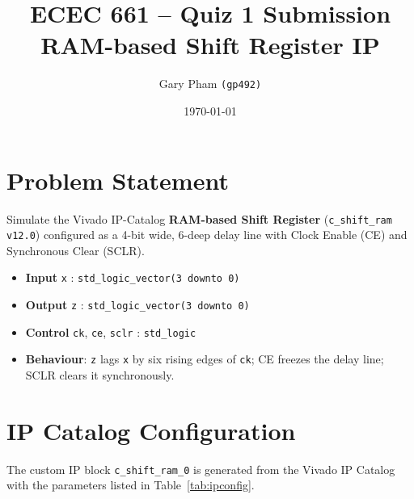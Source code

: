 \documentclass[11pt,letterpaper]{article}
\title{\textbf{ECEC 661 -- Quiz 1 Submission}\\
       \large RAM-based Shift Register IP}
\author{Gary Pham \texttt{(gp492)}}
\date{\today}
\begin{document}
\maketitle

\section{Problem Statement}

Simulate the Vivado IP-Catalog \textbf{RAM-based Shift Register}
(\texttt{c\_shift\_ram v12.0}) configured as a 4-bit wide,
6-deep delay line with Clock Enable (CE) and Synchronous Clear (SCLR).

\begin{itemize}
    \item \textbf{Input} \texttt{x} : \texttt{std\_logic\_vector(3 downto 0)}
    \item \textbf{Output} \texttt{z} : \texttt{std\_logic\_vector(3 downto 0)}
    \item \textbf{Control} \texttt{ck}, \texttt{ce}, \texttt{sclr} : \texttt{std\_logic}
    \item \textbf{Behaviour}: \texttt{z} lags \texttt{x} by six rising edges of
        \texttt{ck}; CE freezes the delay line; SCLR clears it synchronously.
\end{itemize}

\section{IP Catalog Configuration}

The custom IP block \texttt{c\_shift\_ram\_0} is generated from the Vivado
IP Catalog with the parameters listed in Table~\ref{tab:ipconfig}.
\end{document}
